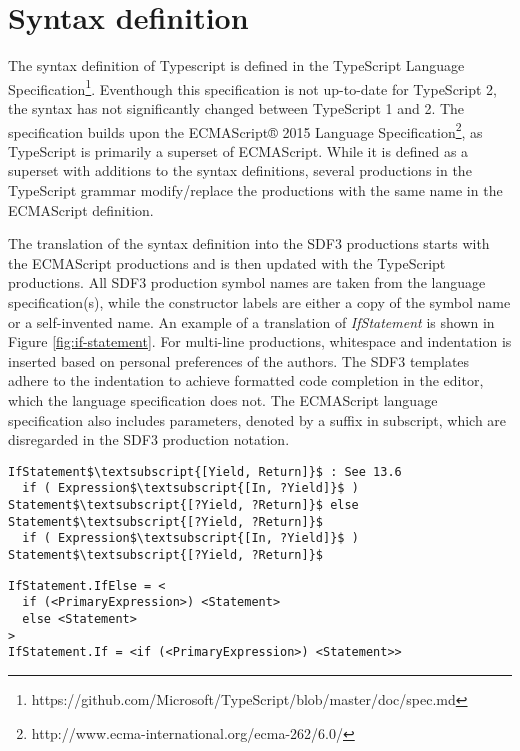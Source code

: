 \section{Syntax definition}
The syntax definition of Typescript is defined in the TypeScript Language Specification\footnote{https://github.com/Microsoft/TypeScript/blob/master/doc/spec.md}.
Eventhough this specification is not up-to-date for TypeScript 2, the syntax has not significantly changed between TypeScript 1 and 2.
The specification builds upon the ECMAScript® 2015 Language Specification\footnote{http://www.ecma-international.org/ecma-262/6.0/}, as TypeScript is primarily a superset of ECMAScript.
While it is defined as a superset with additions to the syntax definitions, several productions in the TypeScript grammar modify/replace the productions with the same name in the ECMAScript definition.

The translation of the syntax definition into the SDF3\citep{Vollebregt:2012:DST:2427048.2427056} productions starts with the ECMAScript productions and is then updated with the TypeScript productions.
All SDF3 production symbol names are taken from the language specification(s), while the constructor labels are either a copy of the symbol name or a self-invented name.
An example of a translation of \textit{IfStatement} is shown in Figure \ref{fig:if-statement}.
For multi-line productions, whitespace and indentation is inserted based on personal preferences of the authors.
The SDF3 templates adhere to the indentation to achieve formatted code completion in the editor, which the language specification does not.
The ECMAScript language specification also includes parameters, denoted by a suffix in subscript, which are disregarded in the SDF3 production notation.

\begin{figure*}
  \begin{lstlisting}[caption=Definition of \textit{IfStatement} in the ECMAScript language specification,mathescape]
IfStatement$\textsubscript{[Yield, Return]}$ : See 13.6
  if ( Expression$\textsubscript{[In, ?Yield]}$ ) Statement$\textsubscript{[?Yield, ?Return]}$ else Statement$\textsubscript{[?Yield, ?Return]}$
  if ( Expression$\textsubscript{[In, ?Yield]}$ ) Statement$\textsubscript{[?Yield, ?Return]}$
  \end{lstlisting}
  \begin{lstlisting}[caption=Definition of \textit{IfStatement} in SDF3 production notation]
IfStatement.IfElse = <
  if (<PrimaryExpression>) <Statement>
  else <Statement>
>
IfStatement.If = <if (<PrimaryExpression>) <Statement>>
  \end{lstlisting}
  \caption{The translation of \textit{IfStatement} from the ECMAScript language specification to SDF3 production notation.}
  \label{fig:if-statement}
\end{figure*}

